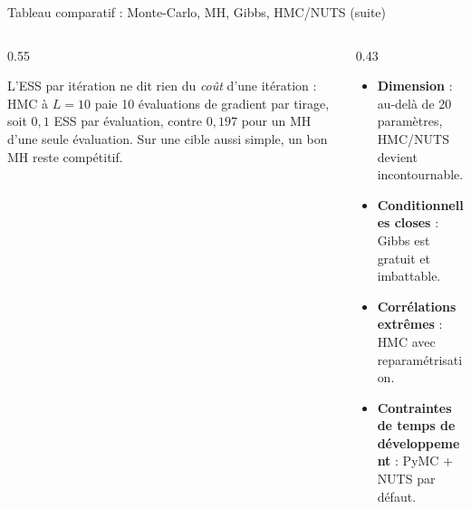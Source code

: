 \begin{frame}{Tableau comparatif : Monte-Carlo, MH, Gibbs, HMC/NUTS (suite)}
\begin{columns}[t]
\begin{column}{0.55\textwidth}
\begin{kbox}
L'ESS par itération ne dit rien du \emph{coût} d'une itération : HMC à $L = 10$
paie 10 évaluations de gradient par tirage, soit $0{,}1$ ESS par évaluation,
contre $0{,}197$ pour un MH d'une seule évaluation. Sur une cible aussi simple,
un bon MH reste compétitif.
\end{kbox}
\end{column}
\begin{column}{0.43\textwidth}
\begin{abox}
\begin{itemize}
  \item \textbf{Dimension} : au-delà de 20 paramètres, HMC/NUTS devient
        incontournable.
  \item \textbf{Conditionnelles closes} : Gibbs est gratuit et imbattable.
  \item \textbf{Corrélations extrêmes} : HMC avec reparamétrisation.
  \item \textbf{Contraintes de temps de développement} : PyMC + NUTS par défaut.
\end{itemize}
\end{abox}
\end{column}
\end{columns}
\end{frame}

